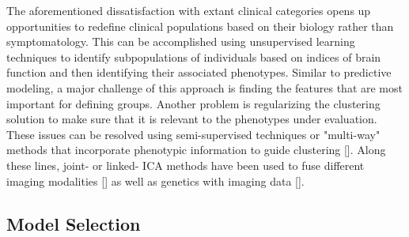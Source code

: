 The aforementioned dissatisfaction with extant clinical categories opens up opportunities to redefine clinical populations based on their biology rather than symptomatology. This can be accomplished using unsupervised learning techniques to identify subpopulations of individuals based on indices of brain function and then identifying their associated phenotypes. Similar to predictive modeling, a major challenge of this approach is finding the features that are most important for defining groups. Another problem is regularizing the clustering solution to make sure that it is relevant to the phenotypes under evaluation. These issues can be resolved using semi-supervised techniques or "multi-way" methods that incorporate phenotypic information to guide clustering []. Along these lines, joint- or linked- ICA methods have been used to fuse different imaging modalities [] as well as genetics with imaging data []. 

\subsection{Model Selection}

